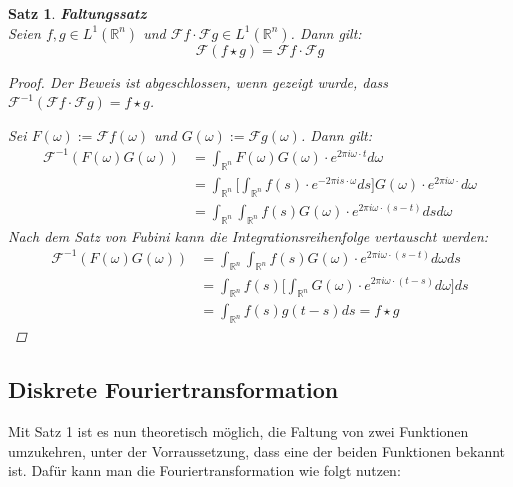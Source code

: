 \documentclass{article}
\newcommand{\R}[0]{\mathbb{R}}
\newcommand{\F}[0]{\mathcal{F}}
\newtheorem{thm}{Satz}
\begin{document}
\begin{thm}
    \textbf{Faltungssatz} \\
    Seien $f,g \in L^1(\R^n)$ und $\mathcal{F}f \cdot \mathcal{F}g \in L^1(\R^n)$. Dann gilt:
    \begin{equation}
        \mathcal{F}(f \star g) = \mathcal{F}f \cdot \mathcal{F}g
    \end{equation}

    \begin{proof}
        Der Beweis ist abgeschlossen, wenn gezeigt wurde, dass $\F^{-1} (\F f \cdot \F g) = f \star g$. 
        
        Sei $F(\omega) := \F f(\omega)$ und $G(\omega) := \F g(\omega)$. Dann gilt: \\
        \begin{align*}
            \F^{-1} (F(\omega) G(\omega)) &= \int_{\R^n} F(\omega) G(\omega) \cdot e^{2\pi i \omega \cdot t} d\omega \\
            &= \int_{\R^n} \Bigg\lbrack \int_{\R^n} f(s) \cdot e^{-2\pi i s \cdot \omega} ds \Bigg\rbrack G(\omega) \cdot e^{2\pi i \omega \cdot} d\omega \\
            &= \int_{\R^n} \int_{\R^n} f(s) G(\omega) \cdot e^{2\pi i \omega \cdot (s - t)} ds d\omega
        \end{align*}
        Nach dem Satz von Fubini kann die Integrationsreihenfolge vertauscht werden:
        \begin{align*}
            \F^{-1} (F(\omega) G(\omega)) &= \int_{\R^n} \int_{\R^n} f(s) G(\omega) \cdot e^{2\pi i \omega \cdot (s - t)} d\omega ds \\
            &= \int_{\R^n} f(s) \Bigg \lbrack \int_{\R^n} G(\omega) \cdot e^{2\pi i \omega \cdot (t - s)} d\omega \Bigg \rbrack ds \\
            &= \int_{\R^n} f(s) g(t-s) ds = f \star g
        \end{align*}
    \end{proof}
\end{thm}

\subsection{Diskrete Fouriertransformation}

Mit Satz 1 ist es nun theoretisch möglich, die Faltung von zwei Funktionen umzukehren, unter der Vorraussetzung, 
dass eine der beiden Funktionen bekannt ist. Dafür kann man die Fouriertransformation wie folgt nutzen:
\end{document}
